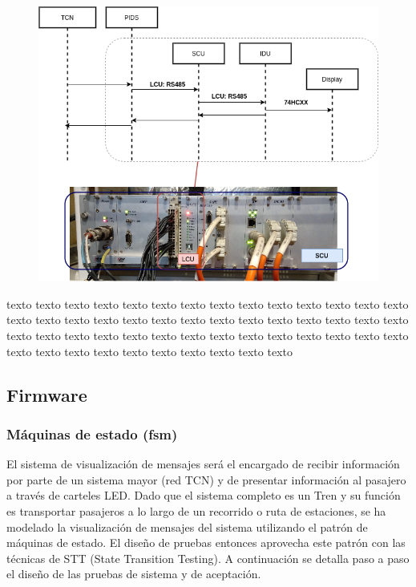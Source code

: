 \documentclass[
11pt, %
]{charter}
\begin{document}
\begin{figure}[htpb]
\centering 
\includegraphics[width=1\textwidth]{./Pics/processDiagram.map.png}
\caption{}
\label{fig:Placa de control map}
\end{figure}
texto texto texto texto texto texto texto texto texto texto texto texto texto texto texto texto texto texto texto texto texto texto texto texto texto texto texto texto texto texto texto texto texto texto texto texto texto texto texto texto texto texto texto texto texto texto texto texto texto texto texto texto 
\pagebreak


	

\pagebreak
\subsection{Firmware}

\subsubsection{Máquinas de estado (fsm)}
El sistema de visualización de mensajes será el encargado de recibir información por parte de un sistema mayor (red TCN) y de presentar información al pasajero a través de carteles LED. Dado que el sistema completo es un Tren y su función es transportar pasajeros a lo largo de un recorrido o ruta de
estaciones, se ha modelado la visualización de mensajes del sistema  utilizando el patrón de máquinas de estado. El diseño de pruebas entonces aprovecha este patrón con las técnicas de STT
(State Transition Testing). A continuación se detalla paso a paso el diseño de las pruebas de sistema y de aceptación. 
\end{document}
